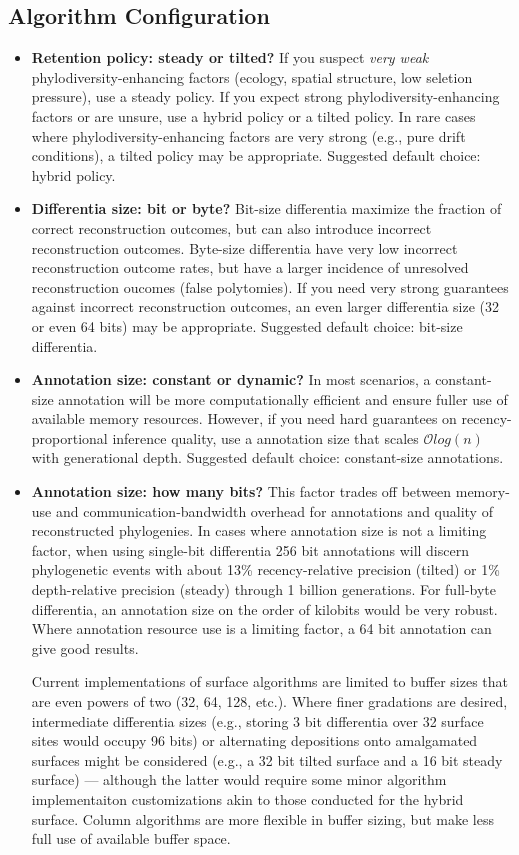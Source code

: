 \subsection{Algorithm Configuration}
\begin{itemize}
\item \textbf{Retention policy: steady or tilted?}
  If you suspect \textit{very weak} phylodiversity-enhancing factors (ecology, spatial structure, low seletion pressure), use a steady policy.
  If you expect strong phylodiversity-enhancing factors or are unsure, use a hybrid policy or a tilted policy.
  In rare cases where phylodiversity-enhancing factors are very strong (e.g., pure drift conditions), a tilted policy may be appropriate.
  Suggested default choice: hybrid policy.
\item \textbf{Differentia size: bit or byte?}
  Bit-size differentia maximize the fraction of correct reconstruction outcomes, but can also introduce incorrect reconstruction outcomes.
  Byte-size differentia have very low incorrect reconstruction outcome rates, but have a larger incidence of unresolved reconstruction oucomes (false polytomies).
  If you need very strong guarantees against incorrect reconstruction outcomes, an even larger differentia size (32 or even 64 bits) may be appropriate.
  Suggested default choice: bit-size differentia.
\item \textbf{Annotation size: constant or dynamic?}
  In most scenarios, a constant-size annotation will be more computationally efficient and ensure fuller use of available memory resources.
  However, if you need hard guarantees on recency-proportional inference quality, use a annotation size that scales $\mathcal{O}log(n)$ with generational depth.
  Suggested default choice: constant-size annotations.
\item \textbf{Annotation size: how many bits?}
  This factor trades off between memory-use and communication-bandwidth overhead for annotations and quality of reconstructed phylogenies.
  In cases where annotation size is not a limiting factor, when using single-bit differentia 256 bit annotations will discern phylogenetic events with about 13\% recency-relative precision (tilted) or 1\% depth-relative precision (steady) through 1 billion generations.
  For full-byte differentia, an annotation size on the order of kilobits would be very robust.
  Where annotation resource use is a limiting factor, a 64 bit annotation can give good results.

  Current implementations of surface algorithms are limited to buffer sizes that are even powers of two (32, 64, 128, etc.).
  Where finer gradations are desired, intermediate differentia sizes (e.g., storing 3 bit differentia over 32 surface sites would occupy 96 bits) or alternating depositions onto amalgamated surfaces might be considered (e.g., a 32 bit tilted surface and a 16 bit steady surface) --- although the latter would require some minor algorithm implementaiton customizations akin to those conducted for the hybrid surface.
  Column algorithms are more flexible in buffer sizing, but make less full use of available buffer space.


\end{itemize}
